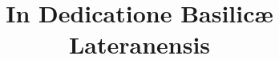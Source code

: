 \documentclass[17pt]{extarticle}
\begin{document}
\title{In Dedicatione Basilicæ Lateranensis}
\makereadingtitle

\end{document}
